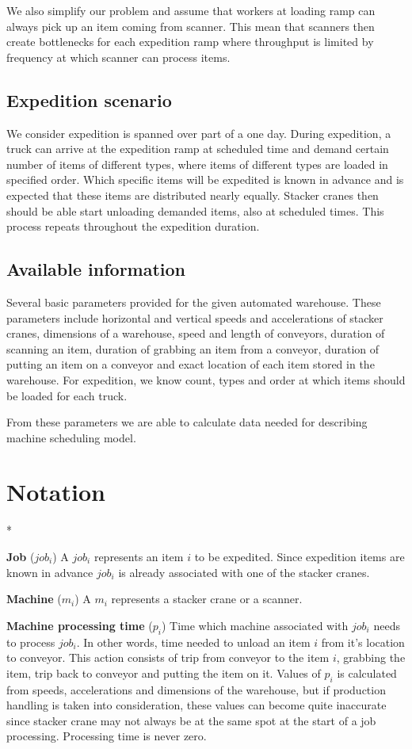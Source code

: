 \documentclass{ctuthesis}
\begin{document}
We also simplify our problem and assume that workers at loading ramp can always pick up an item coming from scanner. This mean that scanners then create bottlenecks for each expedition ramp where throughput is limited by frequency at which scanner can process items.

\subsection{Expedition scenario}
We consider expedition is spanned over part of a one day. During expedition, a truck can arrive at the expedition ramp at scheduled time and demand certain number of items of different types, where items of different types are loaded in specified order. Which specific items will be expedited is known in advance and is expected that these items are distributed nearly equally. Stacker cranes then should be able start unloading demanded items, also at scheduled times. This process repeats throughout the expedition duration. 

\subsection{Available information}
Several basic parameters provided for the given automated warehouse. These parameters include horizontal and vertical speeds and accelerations of stacker cranes, dimensions of a warehouse, speed and length of conveyors, duration of scanning an item, duration of grabbing an item from a conveyor, duration of putting an item on a conveyor and exact location of each item stored in the warehouse. For expedition, we know count, types and order at which items should be loaded for each truck. 

From these parameters we are able to calculate data needed for describing machine scheduling model.

\section{Notation}*

\noindent \textbf{Job} ($job_i$) A $job_i$ represents an item $i$ to be expedited. Since expedition items are known in advance $job_i$ is already associated with one of the stacker cranes. 

\noindent \textbf{Machine} ($m_i$) A $m_i$ represents a stacker crane or a scanner. 

\noindent \textbf{Machine processing time} ($p_i$) Time which machine associated with $job_i$ needs to process $job_i$. In other words, time needed to unload an item $i$ from it's location to conveyor. This action consists of trip from conveyor to the item $i$, grabbing the item, trip back to conveyor and putting the item on it. Values of $p_i$ is calculated from speeds, accelerations and dimensions of the warehouse, but if production handling is taken into consideration, these values can become quite inaccurate since stacker crane may not always be at the same spot at the start of a job processing. Processing time is never zero.
\end{document}
